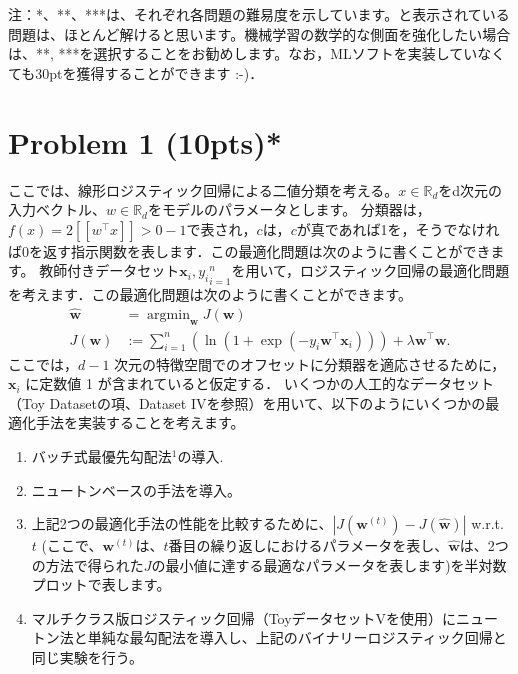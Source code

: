 \documentclass{jsarticle}
\DeclareMathOperator*{\argmin}{argmin}
\begin{document}
\begin{itemize}
  注：*、**、***は、それぞれ各問題の難易度を示しています。と表示されている問題は、ほとんど解けると思います。機械学習の数学的な側面を強化したい場合は、**, ***を選択することをお勧めします。なお，MLソフトを実装していなくても30ptを獲得することができます :-)．
\end{itemize}

\section*{Problem 1 (10pts)*}
ここでは、線形ロジスティック回帰による二値分類を考える。$x \in \mathbb R_d$をd次元の入力ベクトル、$w \in \mathbb R_d$をモデルのパラメータとします。
分類器は，$f(x) = 2 [\![w^\top x]\!] > 0 - 1$で表され，$c$は，$c$が真であれば1を，そうでなければ0を返す指示関数を表します．この最適化問題は次のように書くことができます。
教師付きデータセット${\bm x_i, y_i}^n_{i=1}$を用いて，ロジスティック回帰の最適化問題を考えます．この最適化問題は次のように書くことができます。
\begin{align*}
  \hat{\bm w} &=  \argmin_{\bm w} J(\bm w) \\
  J(\bm w) &:= \sum_{i=1}^n (\ln (1+\exp(-y_i\bm w^\top \bm x_i))) + \lambda\bm w^\top\bm w.
\end{align*}
ここでは，$d - 1$ 次元の特徴空間でのオフセットに分類器を適応させるために，$\bm x_i$ に定数値 1 が含まれていると仮定する．
いくつかの人工的なデータセット（Toy Datasetの項、Dataset IVを参照）を用いて、以下のようにいくつかの最適化手法を実装することを考えます。

\begin{enumerate}
  \item バッチ式最優先勾配法$^1$の導入.
  \item ニュートンベースの手法を導入。
  \item 上記2つの最適化手法の性能を比較するために、$|J(\bm w^{(t)}) - J(\hat{\bm w})|$ w.r.t. $t$ (ここで、$\bm w^{(t)}$は、$t$番目の繰り返しにおけるパラメータを表し、$\hat{\bm w}$は、2つの方法で得られた$J$の最小値に達する最適なパラメータを表します)を半対数プロットで表します。
  \item マルチクラス版ロジスティック回帰（ToyデータセットVを使用）にニュートン法と単純な最勾配法を導入し、上記のバイナリーロジスティック回帰と同じ実験を行う。
\end{enumerate}
\end{document}

